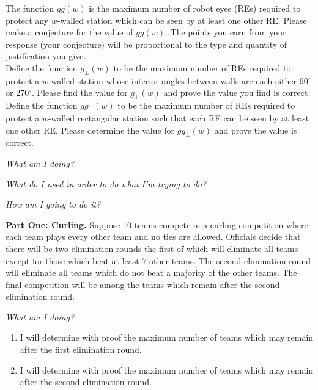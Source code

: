 \documentclass[12pt]{article}
\newenvironment{sub}[2][Sub-Experience]{\begin{trivlist}
\item[\hskip \labelsep {\bfseries #1}\hskip \labelsep {\bfseries #2.}]}{\end{trivlist}}
\begin{document}
 The function $gg(w)$ is the maximum number of robot eyes (REs) required to protect any $w$-walled station which can be seen
by at least one other RE.  Please make a conjecture for the value of $gg(w)$.  The points you earn from your response (your conjecture) will be
proportional to the type and quantity of justification you give. \\

  Define the function $g_{\perp}(w)$ to be the maximum number of REs required to protect a
$w$-walled station whose interior angles between walls are each either $90^{\circ}$ or $270^{\circ}$.  Please find the value for $g_{\perp}(w)$
and prove the value you find is correct.\\

 Define the function $gg_{\perp}(w)$ to be the maximum number of REs required to protect
a $w$-walled rectangular station such that each RE can be seen by at least one other RE. Please determine the value for $gg_{\perp}(w)$ and
prove the value is correct.\newline

\textit{What am I doing?}\newline


\textit{What do I need in order to do what I'm trying to do?}\newline
 
\textit{How am I going to do it?}\newline

\begin{sub}{4. Some Tournament Problems.}

\end{sub}

{\bf Part One: Curling.} Suppose $10$ teams compete in a curling competition where each team plays every other team and no ties are allowed.
Officials decide that there will be two elimination rounds the first of which will eliminate all teams except for those which beat at least $7$ other
teams.  The second elimination round will eliminate all teams which do not beat a majority of the other teams. The final competition will be among the
teams which remain after the second elimination round.\newline

\textit{What am I doing?}\newline
\begin{enumerate}
\item[(A)] I will determine with proof the maximum number of teams which may remain after the first elimination round.
\item[(B)] I will determine with proof the maximum number of teams which may remain after the second elimination round.
\end{enumerate} 
\end{document}
